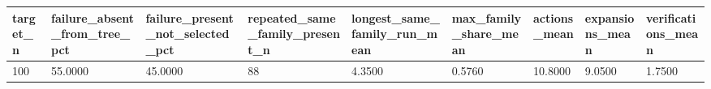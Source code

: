 \begin{tabular}{lllllllll}
\hline
target_n & failure_absent_from_tree_pct & failure_present_not_selected_pct & repeated_same_family_present_n & longest_same_family_run_mean & max_family_share_mean & actions_mean & expansions_mean & verifications_mean \\
\hline
100 & 55.0000 & 45.0000 & 88 & 4.3500 & 0.5760 & 10.8000 & 9.0500 & 1.7500 \\
\hline
\end{tabular}
